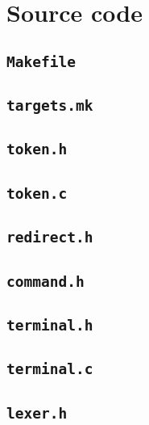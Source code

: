 \section{Source code}
\label{sec:source}

\subsection{\texttt{Makefile}}


\subsection{\texttt{targets.mk}}


\subsection{\texttt{token.h}}


\subsection{\texttt{token.c}}


\subsection{\texttt{redirect.h}}


\subsection{\texttt{command.h}}


\subsection{\texttt{terminal.h}}


\subsection{\texttt{terminal.c}}


\subsection{\texttt{lexer.h}}


